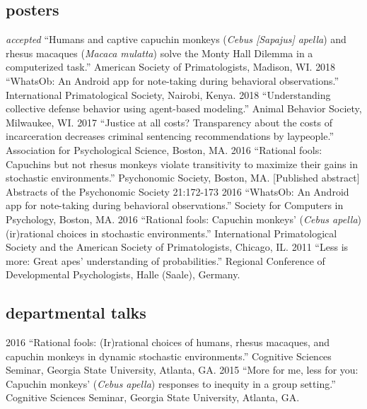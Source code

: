 \documentclass[]{friggeri-cv}
\begin{document}

\subsection{posters}

\begin{entrylist2}
  \entrytwo
    {\emph{accepted}}
    {``Humans and captive capuchin monkeys (\emph{Cebus [Sapajus] apella}) and rhesus macaques (\emph{Macaca mulatta}) solve the Monty Hall Dilemma in a computerized task.'' American Society of Primatologists, Madison, WI.}
  \entrytwo
    {2018}
    {``WhatsOb: An Android app for note-taking during behavioral observations.'' International Primatological Society, Nairobi, Kenya.}
  \entrytwo
    {2018}
    {``Understanding collective defense behavior using agent-based modeling.'' Animal Behavior Society, Milwaukee, WI.}
  \entrytwo
    {2017}
    {``Justice at all costs? Transparency about the costs of incarceration decreases criminal sentencing recommendations by laypeople.'' Association for Psychological Science, Boston, MA.}
\entrytwo
    {2016}
    {``Rational fools: Capuchins but not rhesus monkeys violate transitivity to maximize their gains in stochastic environments.'' Psychonomic Society, Boston, MA. [Published abstract] Abstracts of the Psychonomic Society 21:172-173}
  \entrytwo
    {2016}
    {``WhatsOb: An Android app for note-taking during behavioral observations.'' Society for Computers in Psychology, Boston, MA.}
  \entrytwo
    {2016}
    {``Rational fools: Capuchin monkeys' (\emph{Cebus apella}) (ir)rational choices in stochastic environments.'' International Primatological Society and the American Society of Primatologists, Chicago, IL.}
  \entrytwo
    {2011}
    {``Less is more: Great apes' understanding of probabilities.'' Regional Conference of Developmental Psychologists, Halle (Saale), Germany.}
\end{entrylist2}


\subsection{departmental talks}

\begin{entrylist2}
  \entrytwo
    {2016}
    {``Rational fools: (Ir)rational choices of humans, rhesus macaques, and capuchin monkeys in dynamic stochastic environments.'' Cognitive Sciences Seminar, Georgia State University, Atlanta, GA.}
  \entrytwo
    {2015}
    {``More for me, less for you: Capuchin monkeys' (\emph{Cebus apella}) responses to inequity in a group setting.'' Cognitive Sciences Seminar, Georgia State University, Atlanta, GA.}
\end{entrylist2}
\end{document}
